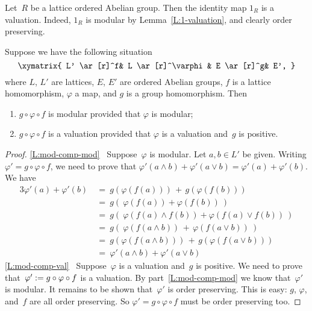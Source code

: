 \documentclass[main.tex]{subfiles}
\begin{document}
\begin{ex}
\label{E:1-valuation}
Let~$R$ be a lattice ordered Abelian group.
Then the identity map $1_R$ is a valuation.
Indeed, $1_R$ is modular by Lemma~\ref{L:1-valuation},
and clearly order preserving.
\end{ex}

\begin{lem}
\label{L:mod-comp}
Suppose we have the following situation
\begin{equation*}
\xymatrix{
L' \ar[r]^f&
L \ar[r]^\varphi&
E \ar[r]^g&
E',
}
\end{equation*}
where $L$, $L'$ are lattices,
$E$, $E'$ are ordered Abelian groups,
$f$ is a lattice homomorphism,
$\varphi$ a map,
and $g$ is a group homomorphism.
Then
\begin{enumerate}
\item
\label{L:mod-comp-mod}
$g\circ \varphi \circ f$ is modular
provided that $\varphi$ is modular;
\item
\label{L:mod-comp-val}
$g\circ \varphi \circ f$ is a valuation
provided that $\varphi$ is a valuation
and~$g$ is positive.
\end{enumerate}
\end{lem}
\begin{proof}
\noindent
\ref{L:mod-comp-mod}
\  Suppose~$\varphi$ is modular.
Let $a,b\in L'$ be given.
Writing $\varphi'= g\circ\varphi \circ f$,
we need to prove that
$\varphi'(a\wedge b)+\varphi'(a\vee b)=\varphi'(a)+\varphi'(b)$.
We have
\begin{alignat*}{3}
\varphi'(a) + \varphi'(b)
\ &=\ g(\varphi(f(a))) \,+\, g(\varphi(f(b))) \\
  &=\ g(\ \varphi( f(a)) + \varphi( f(b))\ ) \\
  &=\ g(\ \varphi(f(a)\wedge f(b)) + \varphi(f(a)\vee f(b))\ ) \\
  &=\ g(\  \varphi(f(a\wedge b)) \,+\, \varphi(f(a\vee b))\ ) \\
  &=\ g(\varphi(f(a\wedge b))) \,+\, g(\varphi(f(a\vee b))) \\ 
  &=\ \varphi'(a\wedge b) + \varphi'(a \vee b)
\end{alignat*}
\ref{L:mod-comp-val}
\  Suppose~$\varphi$ is a valuation
and~$g$ is positive.
We need to prove that~$\varphi':= g\circ \varphi\circ f$
is a valuation.
By part~\ref{L:mod-comp-mod}
we know that~$\varphi'$ is modular.
It remains to be shown that~$\varphi'$ is order preserving.
This is easy: $g$, $\varphi$, and~$f$ are all order preserving.
So $\varphi'=g\circ\varphi\circ f$ must be order preserving too.
\end{proof}
\end{document}
